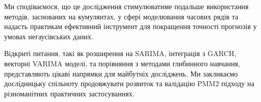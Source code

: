 \documentclass[12pt,a4paper]{article}
\begin{document}
Ми сподіваємося, що це дослідження стимулюватиме подальше використання методів, заснованих на кумулянтах, у сфері моделювання часових рядів та надасть практикам ефективний інструмент для покращення точності прогнозів у умовах негаусівських даних.

Відкриті питання, такі як розширення на SARIMA, інтеграція з GARCH, векторні VARIMA моделі, та порівняння з методами глибинного навчання, представляють цікаві напрямки для майбутніх досліджень. Ми закликаємо дослідницьку спільноту продовжувати розвиток та валідацію PMM2 підходу на різноманітних практичних застосуваннях.




\end{document}
